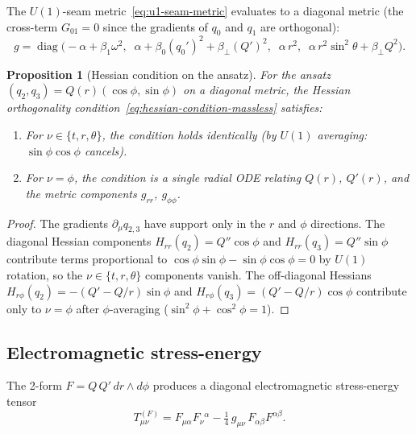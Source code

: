\documentclass[pdflatex,sn-mathphys-num]{sn-jnl}
\theoremstyle{thmstyleone}%
\newtheorem{proposition}[theorem]{Proposition}
\theoremstyle{thmstyletwo}%
\theoremstyle{thmstylethree}%
\newcommand{\pa}{\partial}
\numberwithin{equation}{section}
\begin{document}
The $U(1)$-seam metric~\eqref{eq:u1-seam-metric} evaluates to a
diagonal metric (the cross-term $G_{01} = 0$ since the gradients
of $q_0$ and $q_1$ are orthogonal):
\begin{equation}
\label{eq:u1-metric-explicit}
g = \operatorname{diag}\!\bigl(
  -\alpha + \beta_1\omega^2,\;\;
  \alpha + \beta_0(q_0')^2 + \beta_\perp(Q')^2,\;\;
  \alpha\,r^2,\;\;
  \alpha\,r^2\sin^2\!\theta + \beta_\perp Q^2
\bigr).
\end{equation}

\begin{proposition}[Hessian condition on the ansatz]
\label{prop:hessian-ansatz}
For the ansatz $(q_2,q_3) = Q(r)(\cos\phi,\sin\phi)$ on a
diagonal metric, the Hessian orthogonality
condition~\eqref{eq:hessian-condition-massless} satisfies:
\begin{enumerate}[noitemsep,label=(\roman*)]
\item For $\nu\in\{t,r,\theta\}$, the condition holds identically
  (by $U(1)$ averaging: $\sin\phi\cos\phi$ cancels).
\item For $\nu = \phi$, the condition is a single radial ODE
  relating $Q(r)$, $Q'(r)$, and the metric components
  $g_{rr}$, $g_{\phi\phi}$.
\end{enumerate}
\end{proposition}

\begin{proof}
The gradients $\pa_\mu q_{2,3}$ have support only in the $r$
and $\phi$ directions.  The diagonal Hessian components
$H_{rr}(q_2) = Q''\cos\phi$ and $H_{rr}(q_3) = Q''\sin\phi$
contribute terms proportional to
$\cos\phi\sin\phi - \sin\phi\cos\phi = 0$ by $U(1)$ rotation,
so the $\nu\in\{t,r,\theta\}$ components vanish.  The
off-diagonal Hessians $H_{r\phi}(q_2) = -(Q'-Q/r)\sin\phi$ and
$H_{r\phi}(q_3) = (Q'-Q/r)\cos\phi$ contribute only to
$\nu = \phi$ after $\phi$-averaging ($\sin^2\phi + \cos^2\phi = 1$).
\end{proof}

\subsection{Electromagnetic stress-energy}

The 2-form $F = Q\,Q'\,dr\wedge d\phi$ produces a diagonal
electromagnetic stress-energy tensor
\begin{equation}
\label{eq:T-em-explicit}
T^{(F)}_{\mu\nu} = F_{\mu\alpha}F_\nu{}^\alpha
  - \tfrac{1}{4}\,g_{\mu\nu}\,F_{\alpha\beta}F^{\alpha\beta}.
\end{equation}
\end{document}
